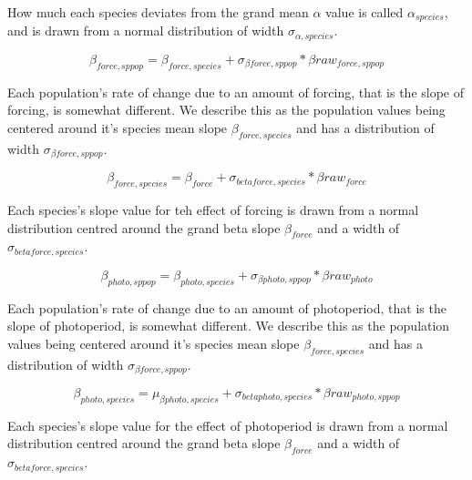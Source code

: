 \documentclass[11pt,letter]{article}
\begin{document}
How much each species deviates from the grand mean $\alpha$ value is called $\alpha_{species} $, and is drawn from a normal distribution of width $\sigma_{\alpha, species} $. 

\begin{equation}
\beta _{force,sppop} = \beta _{force, species} + \sigma_{\beta force,sppop} * \beta raw_{force,sppop}
\end{equation}

Each population's rate of change due to an amount of forcing, that is the slope of forcing, is somewhat different. We describe this as the population values being centered around it's species mean slope $ \beta _{force, species}$ and has a distribution of width $\sigma_{\beta force,sppop} $. 

\begin{equation}
\beta _{force,species} = \beta_{force} + \sigma_{beta force, species} * \beta raw_{force}
\end{equation}

Each species's slope value for teh effect of forcing is drawn from a normal distribution centred around the grand beta slope $\beta_{force}$ and a width of $\sigma_{beta force, species}$.

\begin{equation}
\beta _{photo,sppop} = \beta_{photo,species} + \sigma_{\beta photo,sppop} * \beta raw_{photo}
\end{equation}

Each population's rate of change due to an amount of photoperiod, that is the slope of photoperiod, is somewhat different. We describe this as the population values being centered around it's species mean slope $ \beta _{force, species}$ and has a distribution of width $\sigma_{\beta force,sppop} $. 


\begin{equation}
\beta_{photo,species}  = \mu_{\beta photo, species} + \sigma_{beta photo, species} * \beta raw_{photo, sppop}
\end{equation}

Each species's slope value for the effect of photoperiod is drawn from a normal distribution centred around the grand beta slope $\beta_{force}$ and a width of $\sigma_{beta force, species}$.







\end{document}

